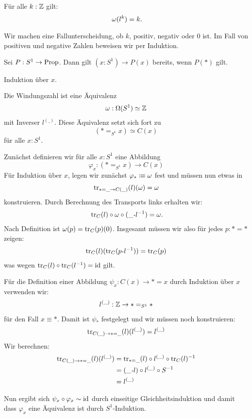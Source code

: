 \begin{lemma}
  \label{windungszahl-exponentiation}
  Für alle $k:\mathbb{Z}$ gilt:
  \[\omega(l^k)=k\rlap{.}\]
\end{lemma}

\begin{beweis}
  Wir machen eine Fallunterscheidung, ob $k$, positiv, negativ oder $0$ ist. Im Fall von positiven und negative Zahlen beweisen wir per Induktion.
\end{beweis}

\begin{bemerkung}
  Sei $P:S^1\to\mathrm{Prop}$.
  Dann gilt $(x:S^1)\to P(x)$ bereits, wenn $P(\ast)$ gilt.
\end{bemerkung}

\begin{beweis}
  Induktion über $x$.
\end{beweis}

\begin{satz}
  Die Windungszahl ist eine Äquivalenz
  \[ \omega:\Omega(S^1)\simeq \mathbb{Z} \]
  mit Inverser $l^{(\_)}$.
  Diese Äquivalenz setzt sich fort zu
  \[ (\ast=_{S^1}x) \simeq C(x) \]
  für alle  $x:S^1$.
\end{satz}

\begin{beweis}
  Zunächst definieren wir für alle $x:S^1$ eine Abbildung
  \[
    \varphi_x : (\ast=_{S^1}x) \to C(x)
  \]
  Für Induktion über $x$, legen wir zunächst $\varphi_\ast\vcentcolon\mspace{-1.2mu}\equiv \omega$ fest und
  müssen nun etwas in
  \[\mathrm{tr}_{\ast=\_\to C(\_)}(l)(\omega)=\omega\]
  konstruieren. Durch Berechnung des Transports links erhalten wir:
  \[
  \transp_C(l)\circ \omega \circ (\_\kon l^{-1}) =\omega\rlap{.}
  \]
  Nach Definition ist $\omega(p)=\mathrm{tr}_C(p)(0)$.
  Insgesamt müssen wir also für jedes $p:\ast=\ast$ zeigen:
  \[
  \transp_C(l)(\transp_C(p\kon l^{-1}))=\transp_C(p)
  \]
  was wegen $\mathrm{tr}_C(l)\circ \mathrm{tr}_C(l^{-1})=\mathrm{id}$ gilt.

  Für die Definition einer Abbildung $\psi_x:C(x)\to \ast=x$ durch Induktion über $x$ verwenden wir:
  \[
    l^{(\_)}:\mathbb{Z}\to \ast=_{S^1}\ast
  \]
  für den Fall $x\equiv\ast$.
  Damit ist $\psi_\ast$ festgelegt und wir müssen noch konstruieren:
  \[
    \mathrm{tr}_{C(\_)\to\ast=\_}(l)(l^{(\_)})=l^{(\_)}
    \]
    Wir berechnen:
    \begin{align*}
      \transp_{C(\_)\to\ast=\_}(l)(l^{(\_)})&=\transp_{\ast=\_}(l)\circ l^{(\_)} \circ \transp_C(l)^{-1} \\
      &=(\_\kon l)\circ l^{(\_)}\circ S^{-1} \\
      &=l^{(\_)}
    \end{align*}

    Nun ergibt sich $\psi_x\circ\varphi_x\sim\mathrm{id}$ durch einseitige Gleichheitsinduktion und
    damit dass $\varphi_x$ eine Äquivalenz ist durch  $S^1$-Induktion.
\end{beweis}


